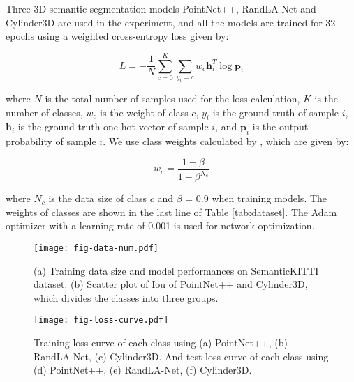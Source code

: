 \documentclass[journal]{IEEEtran}
\begin{document}
Three 3D semantic segmentation models PointNet++, RandLA-Net and Cylinder3D are used in the experiment, and all the models are trained for 32 epochs using a weighted cross-entropy loss given by:

\vspace{-3mm}
\begin{equation}
L = -\frac{1}{N} \sum_{c=0}^K \sum_{y_{i}=c} w_c{\bm h}_i^T \log{ {\bm p}_i} \label{eq:loss}
\end{equation}

where $N$ is the total number of samples used for the loss calculation, $K$ is the number of classes, $w_c$ is the weight of class $c$, $y_{i}$ is the ground truth of sample $i$, ${\bm h}_i$ is the ground truth one-hot vector of sample $i$, and ${\bm p}_i$ is the output probability of sample $i$. We use class weights calculated by \cite{cui2019class}, which are given by:

\vspace{-3mm}
\begin{equation}
w_c = \frac{1-\beta}{1-\beta^{N_c}}  \label{eq:w}
\end{equation}

where $N_c$ is the data size of class $c$ and $\beta$ = 0.9 when training models. The weights of classes are shown in the last line of Table \ref{tab:dataset}. The Adam optimizer with a learning rate of 0.001 is used for network optimization.

\begin{figure}[t]
	\centering
	\texttt{[image: fig-data-num.pdf]}
	\vspace{-6mm}
	\caption{(a) Training data size and model performances on SemanticKITTI dataset. (b) Scatter plot of Iou of PointNet++ and Cylinder3D, which divides the classes into three groups.}%
	\label{fig:data num}
	\vspace{-4mm}
\end{figure}

\begin{figure*}[t]
	\centering
	\texttt{[image: fig-loss-curve.pdf]}
	\vspace{-4mm}
	\caption{Training loss curve of each class using (a) PointNet++, (b) RandLA-Net, (c) Cylinder3D. And test loss curve of each class using (d) PointNet++, (e) RandLA-Net, (f) Cylinder3D.}
	\label{fig:loss curve}
	\vspace{-4mm}
\end{figure*}
\end{document}
